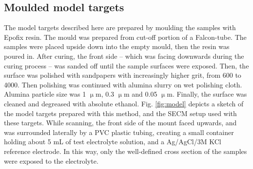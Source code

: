 		\subsection{Moulded model targets}
The model targets described here are prepared by moulding the samples with Epofix resin.
The mould was prepared from cut-off portion of a Falcon-tube.
The samples were placed upside down into the empty mould, then the resin was poured in.
After curing, the front side -- which was facing downwards during the curing process -- was sanded off until the sample surfaces were exposed.
Then, the surface was polished with sandpapers with increasingly higher grit, from 600 to 4000.
Then polishing was continued with alumina slurry on wet polishing cloth.
Alumina particle size was 1 $\upmu$m, 0.3 $\upmu$m and 0.05 $\upmu$m.
Finally, the surface was cleaned and degreased with absolute ethanol.
Fig. \ref{fig:model} depicts a sketch of the model targets prepared with this method, and the SECM setup used with these targets.
While scanning, the front side of the mount faced upwards, and was surrounded laterally by a PVC plastic tubing, creating a small container holding about 5 mL of test electrolyte solution, and a Ag/AgCl/3M KCl reference electrode.
In this way, only the well-defined cross section of the samples were exposed to the electrolyte.


